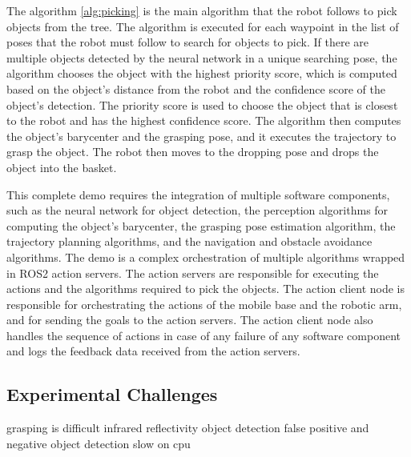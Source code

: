 The algorithm \ref{alg:picking} is the main algorithm that the robot follows to pick objects from the tree.
The algorithm is executed for each waypoint in the list of poses that the robot must follow to search
for objects to pick. If there are multiple objects detected by the neural network in a unique searching pose,
the algorithm chooses the object with the highest priority score, which is computed based on the object's distance
from the robot and the confidence score of the object's detection. The priority score is used to choose the object
that is closest to the robot and has the highest confidence score. The algorithm then computes the object's barycenter
and the grasping pose, and it executes the trajectory to grasp the object. The robot then moves to the dropping pose
and drops the object into the basket. 

This complete demo requires the integration of multiple software components, such as the neural network for object detection,
the perception algorithms for computing the object's barycenter, the grasping pose estimation algorithm, the trajectory
planning algorithms, and the navigation and obstacle avoidance algorithms. The demo is a complex orchestration of
multiple algorithms wrapped in ROS2 action servers. The action servers are responsible for executing the actions
and the algorithms required to pick the objects. The action client node is responsible for orchestrating the actions
of the mobile base and the robotic arm, and for sending the goals to the action servers. The action client node
also handles the sequence of actions in case of any failure of any software component and logs the feedback data
received from the action servers.

\subsection{Experimental Challenges}

grasping is difficult
infrared reflectivity
object detection false positive and negative
object detection slow on cpu

